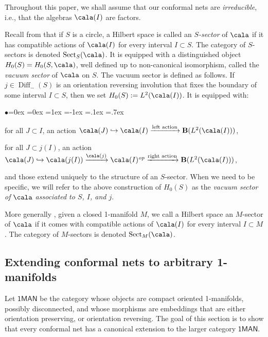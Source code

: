 \documentclass[a4paper,10pt,leqno]{amsart}
\newcommand{\bfB}{{\mathbf B}}   \newcommand{\sfB}{{\mathsf{B}}}
\theoremstyle{plain}
\theoremstyle{definition}
\theoremstyle{remark}
\DeclareMathOperator{\Diff}{Diff}
\DeclareMathOperator{\Rep}{Sect}
\newcommand{\op}{{\mathit{op}}}
\begin{document}
\noindent Throughout this paper, we shall assume that our conformal nets are \emph{irreducible}, i.e., that the algebras $\cala(I)$ are factors.

Recall from \cite[Section 1.B]{BDH(nets)} that if $S$ is a circle, a Hilbert space is called an \emph{$S$-sector} of $\cala$
if it has compatible actions of $\cala(I)$ for every interval $I\subset S$.
The category of $S$-sectors is denoted $\Rep_S(\cala)$.
It is equipped with a distinguished object $H_0(S)=H_0(S,\cala)$, well defined up to non-canonical isomorphism, called the \emph{vacuum sector} of $\cala$ on $S$.
The vacuum sector is defined as follows.
If $j\in\Diff_-(S)$ is an orientation reversing involution that fixes the boundary of some interval $I\subset S$, 
then we set $H_0(S):=L^2(\cala(I))$.
It is equipped with:
\begin{list}{$\bullet$}{\leftmargin=0ex \rightmargin=0ex =1ex =-1ex \itemsep=.1ex \topsep=.7ex}
\item for all $J\subset I$, an action $\cala(J)\hookrightarrow \cala(I)\xrightarrow{\text{left action}} \bfB(L^2(\cala(I)))$,
\item for all $J\subset j(I)$, an action $\cala(J)\hookrightarrow \cala(j(I))\xrightarrow{\!\cala(j)\!}\cala(I)^\op \xrightarrow{\!\text{right action}\!} \bfB(L^2(\cala(I)))$,
\end{list}\vspace{.7ex}
and those extend uniquely to the structure of an $S$-sector.
When we need to be specific, we will refer to the above construction of $H_0(S)$ as
the \emph{vacuum sector of $\cala$ associated to $S$, $I$, and $j$}.

More generally \cite[Section 3.C]{BDH(nets)}, given a closed 1-manifold $M$, we call a Hilbert space an $M$-sector of $\cala$
if it comes with compatible actions of $\cala(I)$ for every interval $I\subset M$.
The category of $M$-sectors is denoted $\Rep_M(\cala)$.




\subsection{Extending conformal nets to arbitrary 1-manifolds}\label{sec: Extend to 1-manifolds}
Let $\mathsf{1MAN}$ be the category whose objects are compact oriented 1-manifolds, possibly disconnected,
and whose morphisms are embeddings that are either orientation preserving, or orientation reversing.
The goal of this section is to show that every conformal net has a canonical extension to the larger category $\mathsf{1MAN}$.
\end{document}

